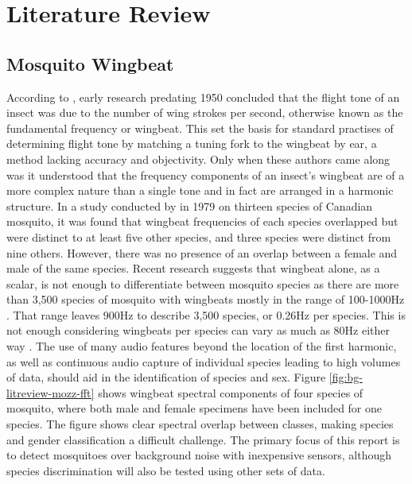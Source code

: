 \section{Literature Review}
\label{sec:bg-litreview}

    \subsection{Mosquito Wingbeat}
    \label{subsec:bg-litreview-mozz}
        
        According to \textcite{Williams1950}, early research predating 1950 concluded that the flight tone of an insect was due to the number of wing strokes per second, otherwise known as the fundamental frequency or wingbeat. This set the basis for standard practises of determining flight tone by matching a tuning fork to the wingbeat by ear, a method lacking accuracy and objectivity. Only when these authors came along was it understood that the frequency components of an insect's wingbeat are of a more complex nature than a single tone and in fact are arranged in a harmonic structure. In a study conducted by \textcite{Belton1979} in 1979 on thirteen species of Canadian mosquito, it was found that wingbeat frequencies of each species overlapped but were distinct to at least five other species, and three species were distinct from nine others. However, there was no presence of an overlap between a female and male of the same species. Recent research suggests that wingbeat alone, as a scalar, is not enough to differentiate between mosquito species as there are more than 3,500 species of mosquito with wingbeats mostly in the range of 100-1000Hz \cite{Chen2014}. That range leaves 900Hz to describe 3,500 species, or 0.26Hz per species. This is not enough considering wingbeats per species can vary as much as 80Hz either way \cite{Arthur2014}. The use of many audio features beyond the location of the first harmonic, as well as continuous audio capture of individual species leading to high volumes of data, should aid in the identification of species and sex. Figure \ref{fig:bg-litreview-mozz-fft} shows wingbeat spectral components of four species of mosquito, where both male and female specimens have been included for one species. The figure shows clear spectral overlap between classes, making species and gender classification a difficult challenge. The primary focus of this report is to detect mosquitoes over background noise with inexpensive sensors, although species discrimination will also be tested using other sets of data.
